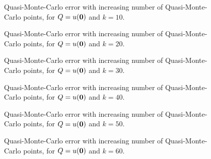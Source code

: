 \begin{figure}[h]
    \centering
    
    \caption[Quasi-Monte-Carlo error, for $Q=u(\bzero)$ and $k=10$.]{Quasi-Monte-Carlo error with increasing number of Quasi-Monte-Carlo points, for $Q=u(\bzero)$ and $k=10$. \label{fig:qmcorigin10}}
  \end{figure}
\begin{figure}[h]
  \centering

\caption[Quasi-Monte-Carlo error, for $Q=u(\bzero)$ and $k=20$.]{Quasi-Monte-Carlo error with increasing number of Quasi-Monte-Carlo points, for $Q=u(\bzero)$ and $k=20$. \label{fig:qmcorigin20}}
\end{figure}
\begin{figure}[h]
    \centering

    
    \caption[Quasi-Monte-Carlo error, for $Q=u(\bzero)$ and $k=30$.]{Quasi-Monte-Carlo error with increasing number of Quasi-Monte-Carlo points, for $Q=u(\bzero)$ and $k=30$. \label{fig:qmcorigin30}}
  \end{figure}
\begin{figure}[h]
  \centering

\caption[Quasi-Monte-Carlo error, for $Q=u(\bzero)$ and $k=40$.]{Quasi-Monte-Carlo error with increasing number of Quasi-Monte-Carlo points, for $Q=u(\bzero)$ and $k=40$. \label{fig:qmcorigin40}}
\end{figure}
\begin{figure}[h]
    \centering
    
    \caption[Quasi-Monte-Carlo error, for $Q=u(\bzero)$ and $k=50$.]{Quasi-Monte-Carlo error with increasing number of Quasi-Monte-Carlo points, for $Q=u(\bzero)$ and $k=50$. \label{fig:qmcorigin50}}
  \end{figure}
\begin{figure}[h]
  \centering

\caption[Quasi-Monte-Carlo error, for $Q=u(\bzero)$ and $k=60$.]{Quasi-Monte-Carlo error with increasing number of Quasi-Monte-Carlo points, for $Q=u(\bzero)$ and $k=60$. \label{fig:qmcorigin60}}
\end{figure}

